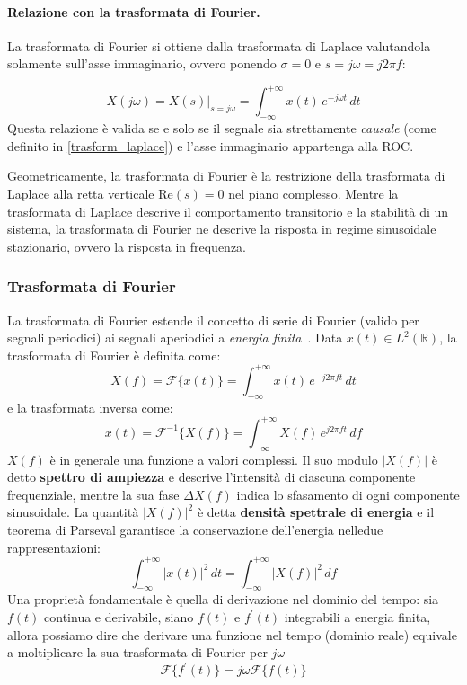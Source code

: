 \paragraph{Relazione con la trasformata di Fourier.}
La trasformata di Fourier si ottiene dalla trasformata di Laplace valutandola solamente sull'asse immaginario, ovvero ponendo $\sigma = 0$ e $s = j\omega = j 2\pi f$:

\[
X(j\omega) = X(s)\big|_{s = j\omega} =
\int_{-\infty}^{+\infty} x(t)\, e^{-j\omega t} \, dt
\]
Questa relazione è valida se e solo se il segnale sia strettamente \textit{causale} (come definito in \ref{trasform_laplace}) e l'asse immaginario appartenga alla ROC.

Geometricamente, la trasformata di Fourier è la restrizione della trasformata di Laplace alla retta verticale $\text{Re}(s) = 0$ nel piano complesso. Mentre la trasformata di Laplace descrive il comportamento transitorio e la stabilità di un sistema, la trasformata di Fourier ne descrive la risposta in regime sinusoidale stazionario, ovvero la risposta in frequenza.

\subsubsection{Trasformata di Fourier}
La trasformata di Fourier estende il concetto di serie di Fourier (valido per segnali periodici) ai segnali aperiodici a \emph{energia finita}~\cite{oppenheim1996signals}. Data $x(t) \in L^2(\mathbb{R})$, la trasformata di Fourier è definita come:
\[
X(f) = \mathcal{F}\{x(t)\} =
\int_{-\infty}^{+\infty} x(t)\, e^{-j2\pi f t} \, dt
\]
e la trasformata inversa come:
\[
x(t) = \mathcal{F}^{-1}\{X(f)\} =
\int_{-\infty}^{+\infty} X(f)\, e^{j2\pi f t} \, df
\]
$X(f)$ è in generale una funzione a valori complessi. Il suo modulo $|X(f)|$ è detto \textbf{spettro di ampiezza} e descrive l'intensità di ciascuna componente frequenziale, mentre la sua fase $\Delta X(f)$ indica lo sfasamento di ogni componente sinusoidale. La quantità $|X(f)|^2$ è detta \textbf{densità spettrale di energia} e il teorema di Parseval garantisce la conservazione dell'energia nelledue rappresentazioni:
\[
\int_{-\infty}^{+\infty} |x(t)|^2\, dt =
\int_{-\infty}^{+\infty} |X(f)|^2\, df
\]
Una proprietà fondamentale è quella di derivazione nel dominio del tempo: sia $f(t)$ continua e derivabile, siano $f(t)$ e $f^{'}(t)$ integrabili a energia finita, allora possiamo dire che derivare una funzione nel tempo (dominio reale) equivale a moltiplicare la sua trasformata di Fourier per $j\omega$
\[
\mathcal{F}\{f^{'}(t)\}=j\omega\mathcal{F}\{f(t)\} 
\]

